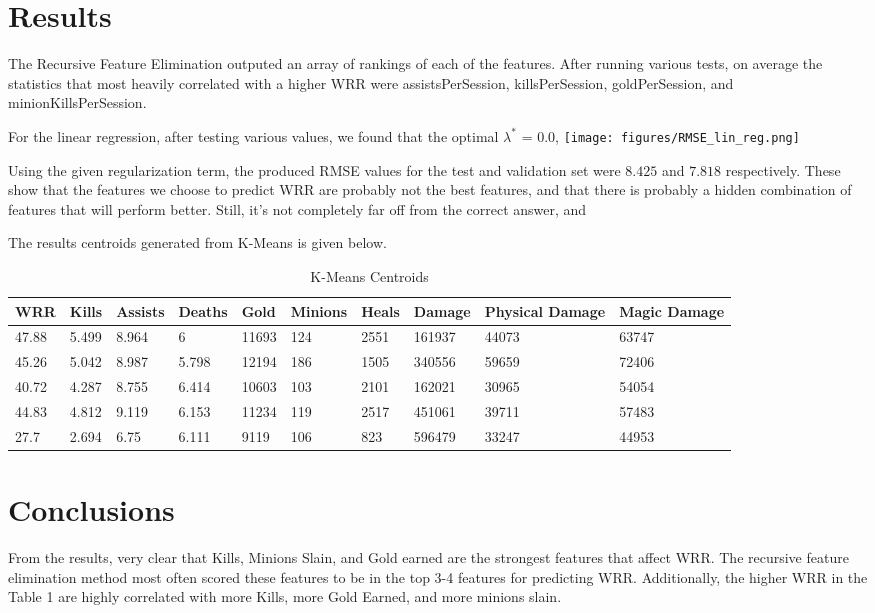 \documentclass{article}
\begin{document}
	
	\section{Results}
	The Recursive Feature Elimination outputed an array of rankings of each of the features. After running various tests, on average the statistics that most heavily correlated with a higher WRR were assistsPerSession, killsPerSession, goldPerSession, and minionKillsPerSession.
	
	For the linear regression, after testing various values, we found that the optimal $\lambda^*$ = 0.0, 
	\texttt{[image: figures/RMSE\_lin\_reg.png]}
	
	Using the given regularization term, the produced RMSE values for the test and validation set were $8.425$ and $7.818$ respectively. These show that the features we choose to predict WRR are probably not the best features, and that there is probably a hidden combination of features that will perform better. Still, it's not completely far off from the correct answer, and 
	
	The results centroids generated from K-Means is given below.
	\begin{table}[]
		\centering
		\caption{K-Means Centroids}
		\label{K-Means}
		\begin{tabular}{|l|l|l|l|l|l|l|l|l|l|}
			\hline
			WRR   & Kills & Assists & Deaths & Gold  & Minions & Heals & Damage & Physical Damage & Magic Damage \\ \hline
			47.88 & 5.499 & 8.964   & 6      & 11693 & 124     & 2551  & 161937 & 44073           & 63747        \\ \hline
			45.26 & 5.042 & 8.987   & 5.798  & 12194 & 186     & 1505  & 340556 & 59659           & 72406        \\ \hline
			40.72 & 4.287 & 8.755   & 6.414  & 10603 & 103     & 2101  & 162021 & 30965           & 54054        \\ \hline
			44.83 & 4.812 & 9.119   & 6.153  & 11234 & 119     & 2517  & 451061 & 39711           & 57483        \\ \hline
			27.7  & 2.694 & 6.75    & 6.111  & 9119  & 106     & 823   & 596479 & 33247           & 44953        \\ \hline
		\end{tabular}
	\end{table}
	
	\section{Conclusions}
	From the results, very clear that Kills, Minions Slain, and Gold earned are the strongest features that affect WRR. The recursive feature elimination method most often scored these features to be in the top 3-4 features for predicting WRR. Additionally, the higher WRR in the Table 1 are highly correlated with more Kills, more Gold Earned, and more minions slain. 
	
\end{document}
